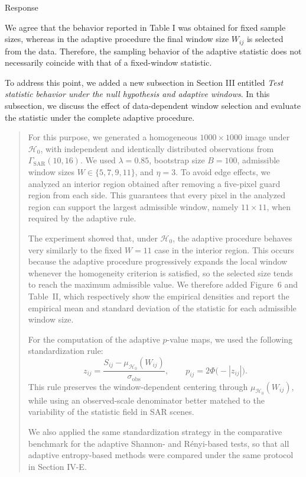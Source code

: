 \documentclass[11pt]{report}
\begin{document}
\begin{responsebox}{Response}

We agree that the behavior reported in Table I was obtained for fixed sample sizes, whereas in the adaptive procedure the final window size $W_{ij}$ is selected from the data. Therefore, the sampling behavior of the adaptive statistic does not necessarily coincide with that of a fixed-window statistic.

To address this point, we added a new subsection in Section III entitled \emph{Test statistic behavior under the null hypothesis and adaptive windows}. In this subsection, we discuss the effect of data-dependent window selection and evaluate the statistic under the complete adaptive procedure.

\begin{quote}
{\color{blue}
For this purpose, we generated a homogeneous $1000\times1000$ image under $\mathcal H_0$, with independent and identically distributed observations from $\Gamma_{\mathrm{SAR}}(10,16)$. We used $\lambda=0.85$, bootstrap size $B=100$, admissible window sizes $W\in\{5,7,9,11\}$, and $\eta=3$. To avoid edge effects, we analyzed an interior region obtained after removing a five-pixel guard region from each side. This guarantees that every pixel in the analyzed region can support the largest admissible window, namely $11\times11$, when required by the adaptive rule.

The experiment showed that, under $\mathcal H_0$, the adaptive procedure behaves very similarly to the fixed $W=11$ case in the interior region. This occurs because the adaptive procedure progressively expands the local window whenever the homogeneity criterion is satisfied, so the selected size tends to reach the maximum admissible value. We therefore added Figure~6 and Table~II, which respectively show the empirical densities and report the empirical mean and standard deviation of the statistic for each admissible window size.

For the computation of the adaptive $p$-value maps, we used the following standardization rule:
\[
z_{ij}=
\frac{S_{ij}-\mu_{\mathcal H_0}(W_{ij})}{\sigma_{\mathrm{obs}}},
\qquad
p_{ij}=2\Phi\bigl(-|z_{ij}|\bigr).
\]
This rule preserves the window-dependent centering through $\mu_{\mathcal H_0}(W_{ij})$, while using an observed-scale denominator better matched to the variability of the statistic field in SAR scenes.

We also applied the same standardization strategy in the comparative benchmark for the adaptive Shannon- and Rényi-based tests, so that all adaptive entropy-based methods were compared under the same protocol in Section IV-E.
}
\end{quote}

\end{responsebox}
\end{document}
